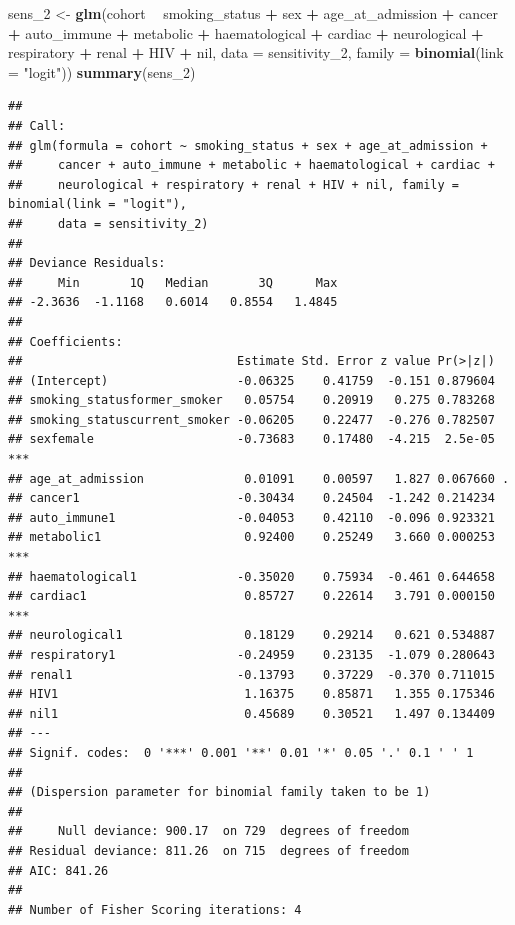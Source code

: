 \documentclass[
]{article}
\newenvironment{Shaded}{\begin{snugshade}}{\end{snugshade}}
\newcommand{\DataTypeTok}[1]{\textcolor[rgb]{0.13,0.29,0.53}{#1}}
\newcommand{\DecValTok}[1]{\textcolor[rgb]{0.00,0.00,0.81}{#1}}
\newcommand{\KeywordTok}[1]{\textcolor[rgb]{0.13,0.29,0.53}{\textbf{#1}}}
\newcommand{\NormalTok}[1]{#1}
\newcommand{\OperatorTok}[1]{\textcolor[rgb]{0.81,0.36,0.00}{\textbf{#1}}}
\newcommand{\StringTok}[1]{\textcolor[rgb]{0.31,0.60,0.02}{#1}}
\begin{document}
\begin{Shaded}
\begin{Highlighting}[]
\NormalTok{sens_}\DecValTok{2}\NormalTok{ <-}\StringTok{ }\KeywordTok{glm}\NormalTok{(cohort }\OperatorTok{~}\StringTok{ }\NormalTok{smoking_status }\OperatorTok{+}\StringTok{ }\NormalTok{sex }\OperatorTok{+}\StringTok{ }\NormalTok{age_at_admission }\OperatorTok{+}\StringTok{ }
\StringTok{                      }\NormalTok{cancer }\OperatorTok{+}\StringTok{ }\NormalTok{auto_immune }\OperatorTok{+}\StringTok{ }\NormalTok{metabolic }\OperatorTok{+}\StringTok{ }\NormalTok{haematological }\OperatorTok{+}\StringTok{ }\NormalTok{cardiac }\OperatorTok{+}\StringTok{ }\NormalTok{neurological }\OperatorTok{+}\StringTok{ }\NormalTok{respiratory }\OperatorTok{+}\StringTok{ }\NormalTok{renal }\OperatorTok{+}\StringTok{ }\NormalTok{HIV }\OperatorTok{+}\StringTok{ }\NormalTok{nil,}
                      \DataTypeTok{data =}\NormalTok{ sensitivity_}\DecValTok{2}\NormalTok{, }\DataTypeTok{family =} \KeywordTok{binomial}\NormalTok{(}\DataTypeTok{link =} \StringTok{"logit"}\NormalTok{))}
\KeywordTok{summary}\NormalTok{(sens_}\DecValTok{2}\NormalTok{)}
\end{Highlighting}
\end{Shaded}

\begin{verbatim}
## 
## Call:
## glm(formula = cohort ~ smoking_status + sex + age_at_admission + 
##     cancer + auto_immune + metabolic + haematological + cardiac + 
##     neurological + respiratory + renal + HIV + nil, family = binomial(link = "logit"), 
##     data = sensitivity_2)
## 
## Deviance Residuals: 
##     Min       1Q   Median       3Q      Max  
## -2.3636  -1.1168   0.6014   0.8554   1.4845  
## 
## Coefficients:
##                              Estimate Std. Error z value Pr(>|z|)    
## (Intercept)                  -0.06325    0.41759  -0.151 0.879604    
## smoking_statusformer_smoker   0.05754    0.20919   0.275 0.783268    
## smoking_statuscurrent_smoker -0.06205    0.22477  -0.276 0.782507    
## sexfemale                    -0.73683    0.17480  -4.215  2.5e-05 ***
## age_at_admission              0.01091    0.00597   1.827 0.067660 .  
## cancer1                      -0.30434    0.24504  -1.242 0.214234    
## auto_immune1                 -0.04053    0.42110  -0.096 0.923321    
## metabolic1                    0.92400    0.25249   3.660 0.000253 ***
## haematological1              -0.35020    0.75934  -0.461 0.644658    
## cardiac1                      0.85727    0.22614   3.791 0.000150 ***
## neurological1                 0.18129    0.29214   0.621 0.534887    
## respiratory1                 -0.24959    0.23135  -1.079 0.280643    
## renal1                       -0.13793    0.37229  -0.370 0.711015    
## HIV1                          1.16375    0.85871   1.355 0.175346    
## nil1                          0.45689    0.30521   1.497 0.134409    
## ---
## Signif. codes:  0 '***' 0.001 '**' 0.01 '*' 0.05 '.' 0.1 ' ' 1
## 
## (Dispersion parameter for binomial family taken to be 1)
## 
##     Null deviance: 900.17  on 729  degrees of freedom
## Residual deviance: 811.26  on 715  degrees of freedom
## AIC: 841.26
## 
## Number of Fisher Scoring iterations: 4
\end{verbatim}
\end{document}
